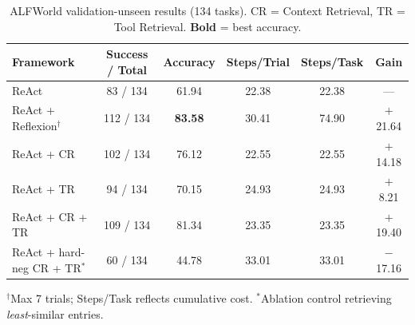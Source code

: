 \begin{table}[t]
\centering
\caption{ALFWorld validation-unseen results (134 tasks). CR = Context Retrieval, TR = Tool Retrieval. \textbf{Bold} = best accuracy.}
\label{tab:alfworld-unseen}
\begin{tabular}{lccccc}
\toprule
Framework & Success / Total & Accuracy & Steps/Trial & Steps/Task & Gain \\
\midrule
ReAct                             &  83 / 134 & 61.94 & 22.38 & 22.38 & --- \\
ReAct + Reflexion$^\dagger$       & 112 / 134 & \textbf{83.58} & 30.41 & 74.90 & $+$21.64 \\
ReAct + CR                        & 102 / 134 & 76.12 & 22.55 & 22.55 & $+$14.18 \\
ReAct + TR                        &  94 / 134 & 70.15 & 24.93 & 24.93 & $+$8.21 \\
ReAct + CR + TR                   & 109 / 134 & 81.34 & 23.35 & 23.35 & $+$19.40 \\
ReAct + hard-neg CR + TR$^*$      &  60 / 134 & 44.78 & 33.01 & 33.01 & $-$17.16 \\
\bottomrule
\end{tabular}
\vspace{2pt}

{\footnotesize $^\dagger$Max 7 trials; Steps/Task reflects cumulative cost. $^*$Ablation control retrieving \emph{least}-similar entries.}
\end{table}
